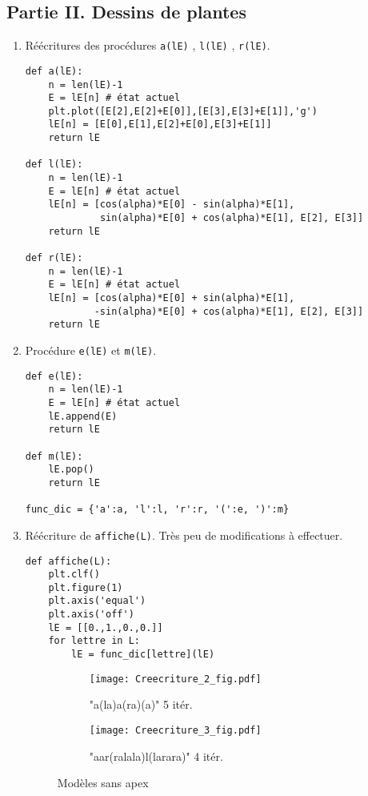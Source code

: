 \subsection*{Partie II. Dessins de plantes}
\begin{enumerate}
 \item Réécritures des procédures \verb|a(lE)| , \verb|l(lE)| , \verb|r(lE)|.
\begin{verbatim}
def a(lE):
    n = len(lE)-1
    E = lE[n] # état actuel
    plt.plot([E[2],E[2]+E[0]],[E[3],E[3]+E[1]],'g')
    lE[n] = [E[0],E[1],E[2]+E[0],E[3]+E[1]] 
    return lE
    
def l(lE):
    n = len(lE)-1
    E = lE[n] # état actuel
    lE[n] = [cos(alpha)*E[0] - sin(alpha)*E[1],
             sin(alpha)*E[0] + cos(alpha)*E[1], E[2], E[3]]
    return lE

def r(lE):
    n = len(lE)-1
    E = lE[n] # état actuel
    lE[n] = [cos(alpha)*E[0] + sin(alpha)*E[1],
            -sin(alpha)*E[0] + cos(alpha)*E[1], E[2], E[3]]
    return lE
\end{verbatim}

\item Procédure \verb|e(lE)| et \verb|m(lE)|.
\begin{verbatim}
def e(lE):
    n = len(lE)-1
    E = lE[n] # état actuel
    lE.append(E)
    return lE

def m(lE):
    lE.pop()
    return lE
    
func_dic = {'a':a, 'l':l, 'r':r, '(':e, ')':m}
\end{verbatim}

\item Réécriture de \verb|affiche(L)|. Très peu de modifications à effectuer.
\begin{verbatim}
def affiche(L):
    plt.clf()
    plt.figure(1)
    plt.axis('equal')
    plt.axis('off')
    lE = [[0.,1.,0.,0.]]
    for lettre in L:
        lE = func_dic[lettre](lE)
\end{verbatim}
\begin{figure}
   \centering
   \begin{subfigure}[b]{6cm}
     \texttt{[image: Creecriture\_2\_fig.pdf]}
     \caption{"a(la)a(ra)(a)" 5 itér.}
     \label{fig:Creecriture_2}
    \end{subfigure}
  \begin{subfigure}[b]{6cm}
    \texttt{[image: Creecriture\_3\_fig.pdf]}
    \caption{"aar(ralala)l(larara)" 4 itér.}
    \label{fig:Creecriture_3}
   \end{subfigure}
   \caption{Modèles sans apex}
\end{figure}


\end{enumerate}
